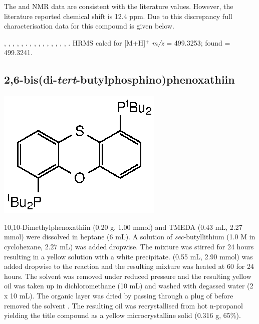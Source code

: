 The \proton{} and \carbon{} NMR data are consistent with the literature values.\cite{Mispelaere2005}  However, the literature reported \phosphorus{} chemical shift is 12.4 ppm.  Due to this discrepancy full characterisation data for this compound is given below.

,
,
,
,
,
.
,
,
,
,
,
,
,
,
,
.
HRMS calcd for  [M+H]$^+$ \emph{m/z} = 499.3253; found = 499.3241.


\subsection*{2,6-bis(di-\emph{tert}-butylphosphino)phenoxathiin}

\begin{structure}[h]
\begin{center}
\includegraphics{../Structures/Transthixantphos.eps}
\end{center}
\end{structure}

10,10-Dimethylphenoxathiin (0.20 g, 1.00 mmol) and TMEDA (0.43 mL, 2.27 mmol) were dissolved in heptane (6 mL).  A solution of \emph{sec}-butyllithium (1.0 M in cyclohexane, 2.27 mL) was added dropwise.  The mixture was stirred for 24 hours resulting in a yellow solution with a white precipitate.   (0.55 mL, 2.90 mmol) was added dropwise to the reaction and the resulting mixture was heated at 60 \degC{}  for 24 hours.  The solvent was removed under reduced pressure and the resulting yellow oil was taken up in dichloromethane (10 mL) and washed with degassed water (2 x 10 mL).  The organic layer was dried by passing through a plug of  before removed the solvent .  The resulting oil was recrystallised from hot n-propanol yielding the title compound as a yellow microcrystalline solid (0.316 g, 65\%).  

